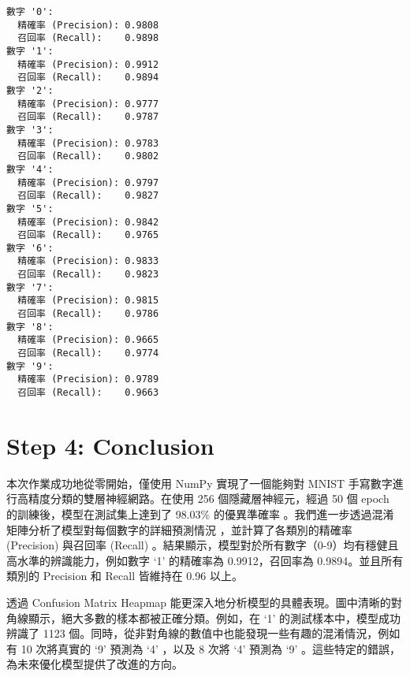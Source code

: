 \documentclass[11pt]{article}
\begin{document}
    \begin{Verbatim}[commandchars=\\\{\}]
數字 '0':
  精確率 (Precision): 0.9808
  召回率 (Recall):    0.9898
數字 '1':
  精確率 (Precision): 0.9912
  召回率 (Recall):    0.9894
數字 '2':
  精確率 (Precision): 0.9777
  召回率 (Recall):    0.9787
數字 '3':
  精確率 (Precision): 0.9783
  召回率 (Recall):    0.9802
數字 '4':
  精確率 (Precision): 0.9797
  召回率 (Recall):    0.9827
數字 '5':
  精確率 (Precision): 0.9842
  召回率 (Recall):    0.9765
數字 '6':
  精確率 (Precision): 0.9833
  召回率 (Recall):    0.9823
數字 '7':
  精確率 (Precision): 0.9815
  召回率 (Recall):    0.9786
數字 '8':
  精確率 (Precision): 0.9665
  召回率 (Recall):    0.9774
數字 '9':
  精確率 (Precision): 0.9789
  召回率 (Recall):    0.9663
    \end{Verbatim}

    \section{Step 4: Conclusion}\label{step-4-conclusion}

本次作業成功地從零開始，僅使用 NumPy 實現了一個能夠對 MNIST
手寫數字進行高精度分類的雙層神經網路。在使用 256 個隱藏層神經元，經過 50
個 epoch 的訓練後，模型在測試集上達到了 98.03\% 的優異準確率
。我們進一步透過混淆矩陣分析了模型對每個數字的詳細預測情況
，並計算了各類別的精確率 (Precision) 與召回率 (Recall)
。結果顯示，模型對於所有數字（0-9）均有穩健且高水準的辨識能力，例如數字
`1' 的精確率為 0.9912，召回率為 0.9894。並且所有類別的 Precision 和
Recall 皆維持在 0.96 以上。

透過 Confusion Matrix Heapmap
能更深入地分析模型的具體表現。圖中清晰的對角線顯示，絕大多數的樣本都被正確分類。例如，在
`1' 的測試樣本中，模型成功辨識了 1123
個。同時，從非對角線的數值中也能發現一些有趣的混淆情況，例如有 10
次將真實的 `9' 預測為 `4' ，以及 8 次將 `4' 預測為 `9'
。這些特定的錯誤，為未來優化模型提供了改進的方向。


    
    
    
\end{document}
